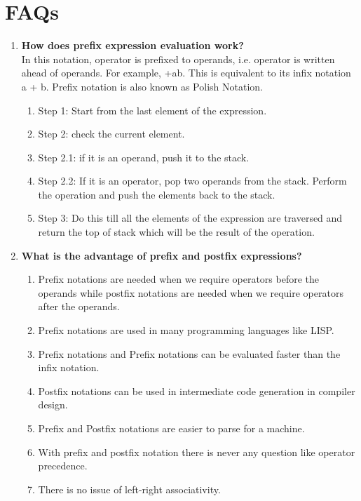 \documentclass[11pt]{article}
\begin{document}
\section{FAQs}
\begin{enumerate}
	\item \textbf{How does prefix expression evaluation work?}\\
	      In this notation, operator is prefixed to operands, i.e. operator is written ahead of operands. For example, +ab. This is equivalent to its infix notation a + b. Prefix notation is also known as Polish Notation.

	      \begin{enumerate}
		      \item Step 1: Start from the last element of the expression.

		      \item Step 2: check the current element.

		      \item Step 2.1: if it is an operand, push it to the stack.
		      \item Step 2.2: If it is an operator, pop two operands from the stack. Perform the operation and push the elements back to the stack.

		      \item Step 3: Do this till all the elements of the expression are traversed and return the top of stack which will be the result of the operation.
	      \end{enumerate}
	\item \textbf{What is the advantage of prefix and postfix expressions?}\\

	      \begin{enumerate}
		      \item Prefix notations are needed when we require operators before the operands while postfix notations are needed when we require operators after the operands.
		      \item Prefix notations are used in many programming languages like LISP.
		      \item Prefix notations and Prefix notations can be evaluated faster than the infix notation.
		      \item Postfix notations can be used in intermediate code generation in compiler design.
		      \item Prefix and Postfix notations are easier to parse for a machine.
		      \item With prefix and postfix notation there is never any question like operator precedence.
		      \item There is no issue of left-right associativity.
	      \end{enumerate}

\end{enumerate}
\end{document}
